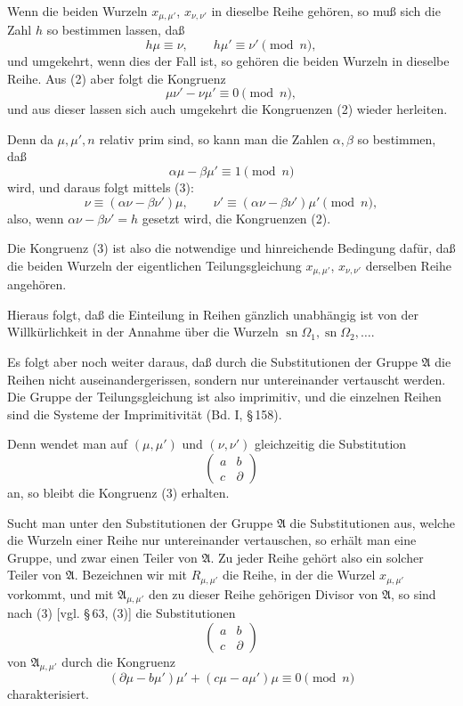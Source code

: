 \documentclass[11pt]{article}
\providecommand{\sn}{\operatorname{sn}}
\begin{document}
Wenn die beiden Wurzeln $x_{\mu,\mu'}$, $x_{\nu,\nu'}$ in dieselbe Reihe gehören, so muß
sich die Zahl $h$ so bestimmen lassen, daß
\begin{equation}
 h\mu\equiv\nu,
 \qquad h\mu'\equiv\nu'\pmod n,
\tag{2}
\end{equation}
und umgekehrt, wenn dies der Fall ist, so gehören die beiden Wurzeln in dieselbe Reihe.
Aus (2) aber folgt die Kongruenz
\begin{equation}
 \mu\nu'-\nu\mu'\equiv0\pmod n,
\tag{3}
\end{equation}
und aus dieser lassen sich auch umgekehrt die Kongruenzen (2) wieder herleiten.

Denn da $\mu,\mu',n$ relativ prim sind, so kann man die Zahlen $\alpha,\beta$ so
bestimmen, daß
\[
 \alpha\mu-\beta\mu'\equiv1\pmod n
\]
wird, und daraus folgt mittels (3):
\[
 \nu\equiv(\alpha\nu-\beta\nu')\mu,
 \qquad
 \nu'\equiv(\alpha\nu-\beta\nu')\mu'\pmod n,
\]
also, wenn $\alpha\nu-\beta\nu'=h$ gesetzt wird, die Kongruenzen (2).

Die Kongruenz (3) ist also die notwendige und hinreichende Bedingung dafür, daß die
beiden Wurzeln der eigentlichen Teilungsgleichung $x_{\mu,\mu'}$, $x_{\nu,\nu'}$ derselben
Reihe angehören.

Hieraus folgt, daß die Einteilung in Reihen gänzlich unabhängig ist von der Willkürlichkeit
in der Annahme über die Wurzeln $\sn\Omega_1,\sn\Omega_2,\ldots$.

Es folgt aber noch weiter daraus, daß durch die Substitutionen der Gruppe $\mathfrak A$ die
Reihen nicht auseinandergerissen, sondern nur untereinander vertauscht werden. Die Gruppe
der Teilungsgleichung ist also imprimitiv, und die einzelnen Reihen sind die Systeme der
Imprimitivität (Bd. I, \S\,158).

Denn wendet man auf $(\mu,\mu')$ und $(\nu,\nu')$ gleichzeitig die Substitution
\[
 \begin{pmatrix}a&b\\ c&\partial\end{pmatrix}
\]
an, so bleibt die Kongruenz (3) erhalten.

Sucht man unter den Substitutionen der Gruppe $\mathfrak A$ die Substitutionen aus, welche
die Wurzeln einer Reihe nur untereinander vertauschen, so erhält man eine Gruppe, und
zwar einen Teiler von $\mathfrak A$. Zu jeder Reihe gehört also ein solcher Teiler von
$\mathfrak A$. Bezeichnen wir mit $R_{\mu,\mu'}$ die Reihe, in der die Wurzel
$x_{\mu,\mu'}$ vorkommt, und mit $\mathfrak A_{\mu,\mu'}$ den zu dieser Reihe gehörigen
Divisor von $\mathfrak A$, so sind nach (3) [vgl. \S\,63, (3)] die Substitutionen
\[
 \begin{pmatrix}a&b\\ c&\partial\end{pmatrix}
\]
von $\mathfrak A_{\mu,\mu'}$ durch die Kongruenz
\begin{equation}
 (\partial\mu-b\mu')\mu' + (c\mu-a\mu')\mu\equiv0\pmod n
\tag{4}
\end{equation}
charakterisiert.
\end{document}
